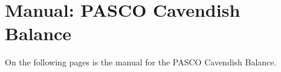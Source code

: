 \chapter{Manual: PASCO Cavendish Balance}\label{cha:pasco-cavendish}

On the following pages is the manual for the PASCO Cavendish Balance.

